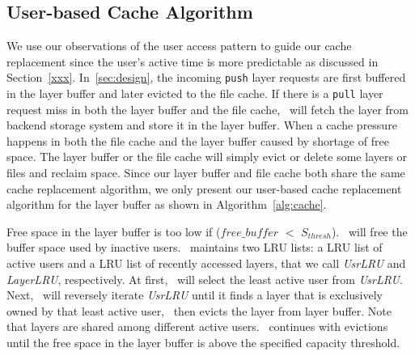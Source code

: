 \subsection{User-based Cache Algorithm}
\label{sec:design_cache_algori}



We use our observations of the user access pattern to guide our cache replacement
since the user's active time is more predictable as discussed in Section~\ref{xxx}.
In~\cref{sec:design}, the incoming \texttt{push} layer requests are first buffered in the layer buffer and later evicted to the file cache.
If there is a \texttt{pull} layer request miss in both the layer buffer and the file cache, 
\sysname~will fetch the layer from backend storage system and store it in the layer buffer.
When a cache pressure happens in both the file cache and the layer buffer caused by shortage of free space.
The layer buffer or the file cache will simply evict or delete some layers or files and reclaim space.
Since our layer buffer and file cache both share the same cache replacement algorithm, we only present
our user-based cache replacement algorithm for the layer buffer  as shown in Algorithm~\ref{alg:cache}.

Free space in the layer buffer is too low if ($free\_buffer$ $<$ $S_{thresh}$). 
\sysname~will free the buffer space used by inactive users. 
\sysname~maintains two LRU lists: a LRU list of active users and
a LRU list of recently accessed layers, that we call \emph{UsrLRU} and \emph{LayerLRU}, respectively.
At first, \sysname~will select the least active user from \emph{UsrLRU}.
Next, \sysname~will reversely iterate \emph{UsrLRU} until it finds a layer that is exclusively owned by that least active user, 
\sysname~then evicts the layer from layer buffer. 
 Note that layers are shared among different active users.
 \sysname~continues with evictions until the free space in the layer buffer is above the specified capacity threshold.
 


